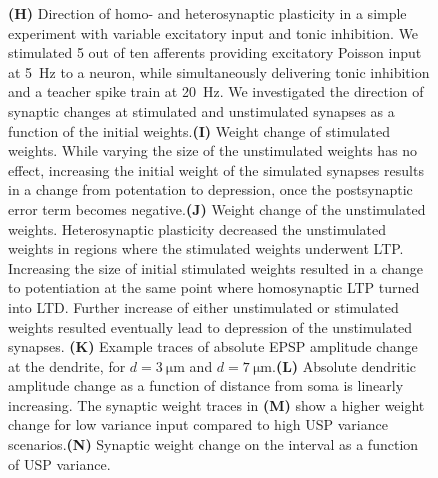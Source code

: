 \documentclass[12pt]{article}
\begin{document}
\begin{figure}
{{\bf(H)} Direction of homo- and heterosynaptic plasticity in a simple experiment with variable excitatory input and tonic inhibition. We stimulated \num{5} out of ten afferents providing excitatory Poisson input at \SI{5}{\hertz} to a neuron, while simultaneously delivering tonic inhibition and a teacher spike train at \SI{20}{\hertz}. We investigated the direction of synaptic changes at stimulated and unstimulated synapses as a function of the initial weights.{\bf (I)} Weight change of stimulated weights. While varying the size of the unstimulated weights has no effect, increasing the initial weight of the simulated synapses results in a change from potentation to depression, once the postsynaptic error term becomes negative.{\bf (J)} Weight change of the unstimulated weights. Heterosynaptic plasticity decreased the unstimulated weights in regions where the stimulated weights underwent LTP. Increasing the size of initial stimulated weights resulted in a change to potentiation at the same point where homosynaptic LTP turned into LTD. Further increase of either unstimulated or stimulated weights resulted eventually lead to depression of the unstimulated synapses. {\bf(K)} Example traces of absolute EPSP amplitude change at the dendrite, for $d=\SI{3}{\micro\meter}$ and $d=\SI{7}{\micro\meter}$.{\bf(L)} Absolute dendritic amplitude change as a function of distance from soma is linearly increasing. The synaptic weight traces in {\bf(M)} show a higher weight change for low variance input compared to high USP variance scenarios.{\bf(N)} Synaptic weight change on the interval as a function of USP variance.}
\end{figure}
\end{document}
